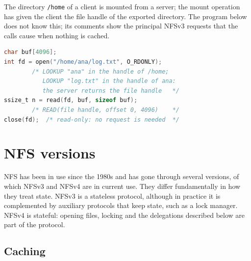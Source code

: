 \documentclass[../main.tex]{subfiles}
\begin{document}
\begin{example}
  The directory \texttt{/home} of a client is mounted from a server; the
  mount operation has given the client the file handle of the exported
  directory.  The program below does not know this; its comments show the
  principal NFSv3 requests that the calls cause when nothing is
  cached.
  \begin{lstlisting}[language=C, numbers=none]
char buf[4096];
int fd = open("/home/ana/log.txt", O_RDONLY);
        /* LOOKUP "ana" in the handle of /home;
           LOOKUP "log.txt" in the handle of ana:
           the server returns the file handle   */
ssize_t n = read(fd, buf, sizeof buf);
        /* READ(file handle, offset 0, 4096)    */
close(fd);  /* read-only: no request is needed  */
\end{lstlisting}
\end{example}

\section{NFS versions}
\label{sec:l14-nfs-versions}

NFS has been in use since the 1980s and has gone through several
versions, of which NFSv3 \cite{rfc1813} and NFSv4 \cite{rfc7530} are in
current use.  They differ fundamentally in how they
treat state.  NFSv3 is a stateless protocol, although in practice it is
complemented by auxiliary protocols that keep state, such as a lock
manager.  NFSv4 is stateful: opening files, locking and the delegations
described below are part of the protocol.

\subsection{Caching}
\end{document}

